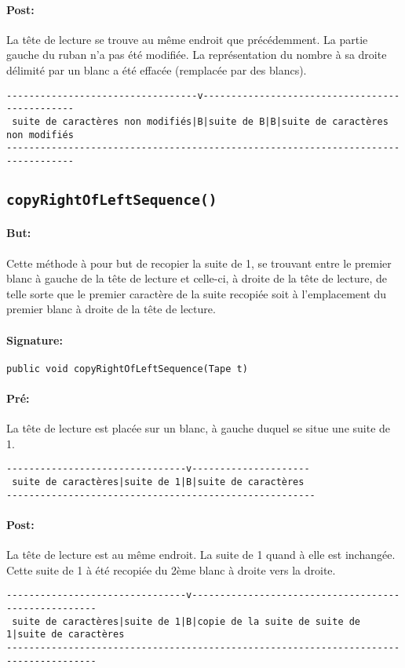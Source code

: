 \documentclass[a4paper,11pt]{article}
\begin{document}
\paragraph{Post:} 
La tête de lecture se trouve au même endroit que précédemment. La partie gauche du ruban n'a pas été modifiée. La représentation du nombre à sa droite délimité par un blanc a été effacée (remplacée par des blancs).
\begin{small}
\begin{verbatim}
----------------------------------v-----------------------------------------------
 suite de caractères non modifiés|B|suite de B|B|suite de caractères non modifiés
----------------------------------------------------------------------------------
\end{verbatim}
\end{small}
\subsection{\texttt{copyRightOfLeftSequence()}}
\paragraph{But:} Cette méthode à pour but de recopier la suite de 1, se trouvant entre le premier blanc à gauche de la tête de lecture et celle-ci, à droite de la tête de lecture, de telle sorte que le premier caractère de la suite recopiée soit à l'emplacement du premier blanc à droite de la tête de lecture.
\paragraph{Signature:} \texttt{public void copyRightOfLeftSequence(Tape t)}
\paragraph{Pré:} La tête de lecture est placée sur un blanc, à gauche duquel se situe une suite de 1.
\begin{verbatim}
--------------------------------v---------------------
 suite de caractères|suite de 1|B|suite de caractères
-------------------------------------------------------
\end{verbatim}
\paragraph{Post:} La tête de lecture est au même endroit. La suite de 1 quand à elle est inchangée. Cette suite de 1 à été recopiée du 2ème blanc à droite vers la droite.
\begin{small}
\begin{verbatim}
--------------------------------v-----------------------------------------------------
 suite de caractères|suite de 1|B|copie de la suite de suite de 1|suite de caractères
--------------------------------------------------------------------------------------
\end{verbatim}
\end{small}
\end{document}
